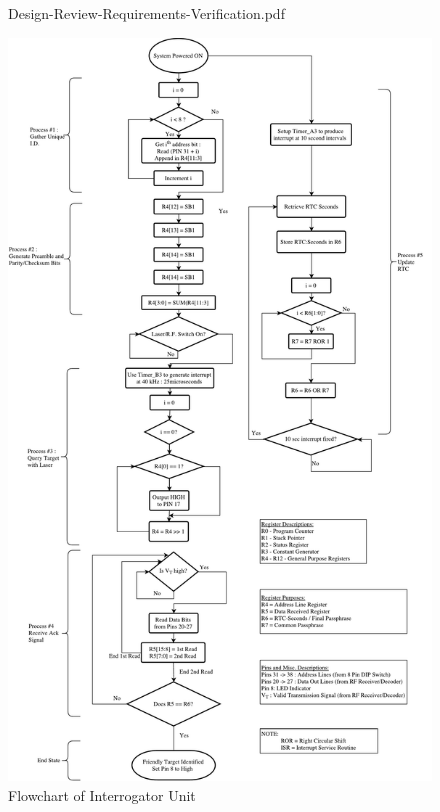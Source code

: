 \documentclass[letterpaper,10pt]{article}
\begin{document}
\begin{spacing}{1.15}
\begin{figure} [H]
	\centering
	 {Design-Review-Requirements-Verification.pdf}
\end{figure}
\clearpage
\begin{figure} [H]
	\centering
	\includegraphics[scale=0.40]{Friendly_Interrogator_Software_Flowchart.pdf}
	\caption{Flowchart of Interrogator Unit\label{fig:friendly-interrogator-software-flowchart}}
\end{figure}


\end{spacing}
\end{document}
